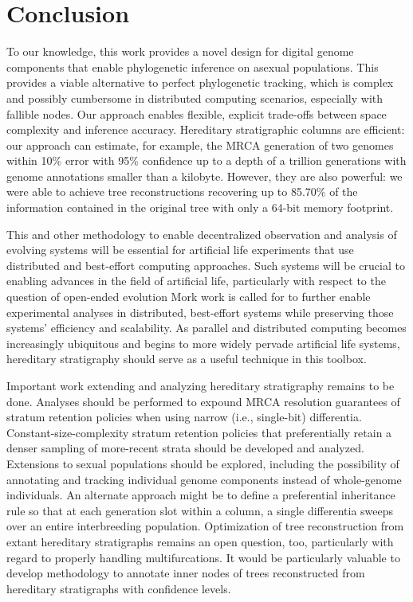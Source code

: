 \section{Conclusion} \label{sec:conclusion}

To our knowledge, this work provides a novel design for digital genome components that enable phylogenetic inference on asexual populations.
This provides a viable alternative to perfect phylogenetic tracking, which is complex and possibly cumbersome in distributed computing scenarios, especially with fallible nodes.
Our approach enables flexible, explicit trade-offs between space complexity and inference accuracy.
Hereditary stratigraphic columns are efficient: our approach can estimate, for example, the MRCA generation of two genomes within 10\% error with 95\% confidence up to a depth of a trillion generations with genome annotations smaller than a kilobyte.
However, they are also powerful: we were able to achieve tree reconstructions recovering up to 85.70\% of the information contained in the original tree with only a 64-bit memory footprint.

This and other methodology to enable decentralized observation and analysis of evolving systems will be essential for artificial life experiments that use distributed and best-effort computing approaches.
Such systems will be crucial to enabling advances in the field of artificial life, particularly with respect to the question of open-ended evolution \citep{ackley2011pursue,moreno2021conduit,moreno2021case}
Mork work is called for to further enable experimental analyses in distributed, best-effort systems while preserving those systems' efficiency and scalability.
As parallel and distributed computing becomes increasingly ubiquitous and begins to more widely pervade artificial life systems, hereditary stratigraphy should serve as a useful technique in this toolbox.

Important work extending and analyzing hereditary stratigraphy remains to be done.
Analyses should be performed to expound MRCA resolution guarantees of stratum retention policies when using narrow (i.e., single-bit) differentia.
Constant-size-complexity stratum retention policies that preferentially retain a denser sampling of more-recent strata should be developed and analyzed.
Extensions to sexual populations should be explored, including the possibility of annotating and tracking individual genome components instead of whole-genome individuals.
An alternate approach might be to define a preferential inheritance rule so that at each generation slot within a column, a single differentia sweeps over an entire interbreeding population.
Optimization of tree reconstruction from extant hereditary stratigraphs remains an open question, too, particularly with regard to properly handling multifurcations.
It would be particularly valuable to develop methodology to annotate inner nodes of trees reconstructed from hereditary stratigraphs with confidence levels.

